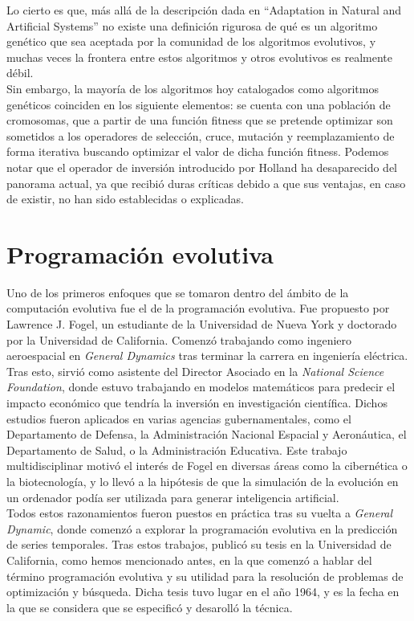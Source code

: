 \documentclass[12pt]{article} \usepackage[utf8]{inputenc}
\begin{document}
Lo cierto es que, más allá de la descripción dada en ``Adaptation in
Natural and Artificial Systems'' no existe una definición rigurosa de
qué es un algoritmo genético que sea aceptada por la comunidad de los
algoritmos evolutivos, y muchas veces la frontera entre estos
algoritmos y otros evolutivos es
realmente débil. \\

Sin embargo, la mayoría de los algoritmos hoy catalogados como
algoritmos genéticos coinciden en los siguiente elementos: se cuenta
con una población de cromosomas, que a partir de una función fitness
que se pretende optimizar son sometidos a los operadores de selección,
cruce, mutación y reemplazamiento de forma iterativa buscando
optimizar el valor de dicha función fitness.  Podemos notar que el
operador de inversión introducido por Holland ha desaparecido del
panorama actual, ya que recibió duras críticas debido a que sus
ventajas, en caso de existir, no han
sido establecidas o explicadas.\\


\section{Programación evolutiva}

Uno de los primeros enfoques que se tomaron dentro del ámbito de la
computación evolutiva fue el de la programación evolutiva. Fue
propuesto por Lawrence J. Fogel, un estudiante de la Universidad de
Nueva York y doctorado por la Universidad de California. Comenzó
trabajando como ingeniero aeroespacial en \textit{General Dynamics}
tras terminar la carrera en ingeniería eléctrica. Tras esto, sirvió
como asistente del Director Asociado en la \textit{National Science
  Foundation}, donde estuvo trabajando en modelos matemáticos para
predecir el impacto económico que tendría la inversión en
investigación científica.  Dichos estudios fueron aplicados en varias
agencias gubernamentales, como el Departamento de Defensa, la
Administración Nacional Espacial y Aeronáutica, el Departamento de
Salud, o la Administración Educativa. Este trabajo multidisciplinar
motivó el interés de Fogel en diversas áreas como la cibernética o la
biotecnología, y lo llevó a la hipótesis de que la simulación de la
evolución en un ordenador podía ser utilizada para generar
inteligencia artificial.\\

Todos estos razonamientos fueron puestos en práctica tras su vuelta a
\textit{General Dynamic}, donde comenzó a explorar la programación
evolutiva en la predicción de series temporales. Tras estos trabajos,
publicó su tesis en la Universidad de California, como hemos
mencionado antes, en la que comenzó a hablar del término programación
evolutiva y su utilidad para la resolución de problemas de
optimización y búsqueda. Dicha tesis tuvo lugar en el año 1964, y es
la fecha en la que se considera que se especificó y desarolló la
técnica.\\
\end{document}
